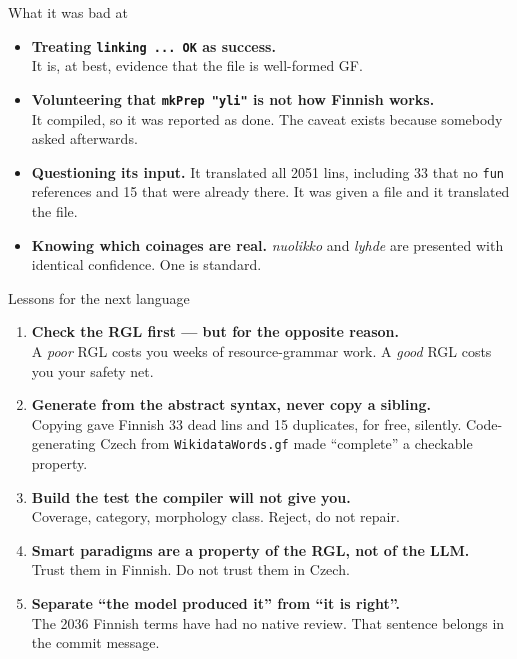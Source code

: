\documentclass[10pt,aspectratio=169]{beamer}
\begin{document}
\begin{frame}{What it was bad at}
  \begin{itemize}
    \item \textbf{Treating \texttt{linking ... OK} as success.} \\
          It is, at best, evidence that the file is well-formed GF.
    \item \textbf{Volunteering that \texttt{mkPrep "yli"} is not how Finnish works.} \\
          It compiled, so it was reported as done. The caveat exists because
          somebody asked afterwards.
    \item \textbf{Questioning its input.} It translated all 2051 lins, including
          33 that no \texttt{fun} references and 15 that were already there.
          It was given a file and it translated the file.
    \item \textbf{Knowing which coinages are real.} \emph{nuolikko} and
          \emph{lyhde} are presented with identical confidence. One is standard.
  \end{itemize}
\end{frame}

\begin{frame}{Lessons for the next language}
  \begin{enumerate}
    \item \textbf{Check the RGL first --- but for the opposite reason.} \\
          \small A \emph{poor} RGL costs you weeks of resource-grammar work.
          A \emph{good} RGL costs you your safety net.
    \item \normalsize \textbf{Generate from the abstract syntax, never copy a sibling.} \\
          \small Copying gave Finnish 33 dead lins and 15 duplicates, for free,
          silently. Code-generating Czech from \texttt{WikidataWords.gf} made
          ``complete'' a checkable property.
    \item \normalsize \textbf{Build the test the compiler will not give you.} \\
          \small Coverage, category, morphology class. Reject, do not repair.
    \item \normalsize \textbf{Smart paradigms are a property of the RGL, not of the LLM.} \\
          \small Trust them in Finnish. Do not trust them in Czech.
    \item \normalsize \textbf{Separate ``the model produced it'' from ``it is right''.} \\
          \small The 2036 Finnish terms have had no native review. That sentence
          belongs in the commit message.
  \end{enumerate}
\end{frame}
\end{document}
